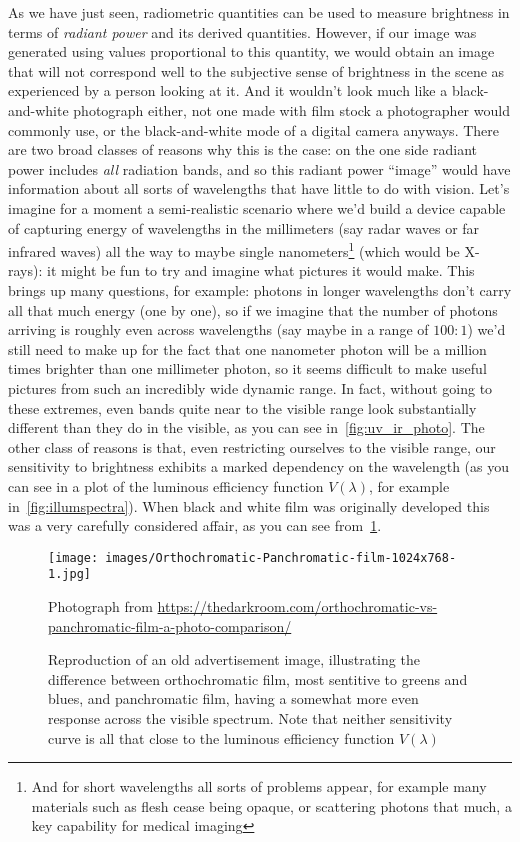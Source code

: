 As we have just seen, radiometric quantities can be used to measure brightness in 
terms of \emph{\gls{radiant power}} and its derived quantities.
However, if our image was generated using values proportional to this quantity,
we would obtain an image that will not correspond well to the subjective 
sense of brightness in the scene as experienced by a person looking at it. 
And it wouldn't look much like a black-and-white photograph either, not one made
with film stock a photographer would commonly use, or the black-and-white mode 
of a digital camera anyways.
There are two broad classes of reasons why this is the case: 
on the one side radiant power includes \emph{all} radiation
bands, and so this radiant power ``image'' would have information about all sorts 
of wavelengths that have little to do with vision. 
Let's imagine for a moment a semi-realistic scenario where we'd build a device 
capable of capturing energy of wavelengths in the millimeters (say radar waves 
or far infrared waves) all the way to maybe single nanometers\footnote{
	And for short wavelengths all sorts of
	problems appear, for example many materials such as flesh cease being opaque, or 
	scattering photons that much, a key capability for medical imaging} 
(which would be X-rays): it might be fun to try and imagine what pictures it would make.
This brings up many questions, for example: photons in longer wavelengths don't carry
all that much energy (one by one), so if we imagine that the number of photons arriving
is roughly even across wavelengths (say maybe in a range of $100:1$) we'd still need to make
up for the fact that one nanometer photon will be a million times brighter than one millimeter
photon, so it seems difficult to make useful pictures from such an incredibly wide dynamic range.
In fact, without going to these extremes, even bands quite near to the visible range look 
substantially different than they do in the visible, as you can see in~\cref{fig:uv_ir_photo}. 
The other class of reasons is that, even restricting ourselves to the visible range, 
our sensitivity to brightness exhibits a marked dependency on the wavelength 
(as you can see in a plot of the luminous efficiency 
function $V(\lambda)$, for example in~\cref{fig:illumspectra}).
When black and white film was originally developed this was a very carefully considered
affair, as you can see from~\cref{fig:orthopanphoto}.

\begin{figure}
	{
		\hfill
		\texttt{[image: images/Orthochromatic-Panchromatic-film-1024x768-1.jpg]}
		\hfill
	}	
	
	\caption{\label{fig:orthopanphoto}
		Reproduction of an old advertisement image, illustrating the difference between
		orthochromatic film, most sentitive to greens and blues, and panchromatic film,
		having a somewhat more even response across the visible spectrum. 
		Note that neither sensitivity curve is all that close to the luminous efficiency
		function $V(\lambda)$}
	{\scriptsize\hfill
		Photograph from \url{https://thedarkroom.com/orthochromatic-vs-panchromatic-film-a-photo-comparison/}
	}
\end{figure}

